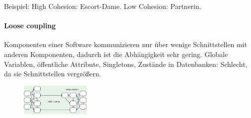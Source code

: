 Beispiel: High Cohesion: Escort-Dame. Low Cohesion: Partnerin.

\paragraph{Loose coupling}\label{loose-coupling}

Komponenten einer Software kommunizieren nur über wenige Schnittstellen
mit anderen Komponenten, dadurch ist die Abhängigkeit sehr gering.
Globale Variablen, öffentliche Attribute, Singletons, Zustände in
Datenbanken: Schlecht, da sie Schnittstellen vergrößern.

\begin{figure} [h]
	\raggedright
	\includegraphics[width=0.3\textwidth]{images/loose_coupling}
\end{figure}
